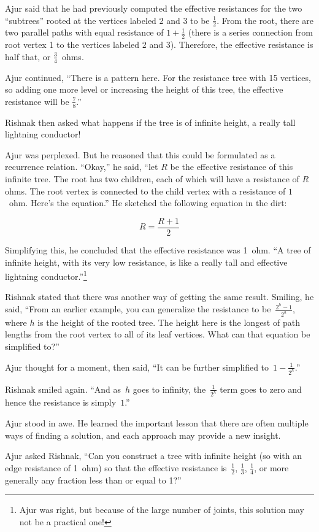 Ajur said that he had previously computed the effective resistances for the two ``subtrees'' rooted at the vertices labeled 2 and 3 to be $\frac{1}{2}$. From the root, there are two parallel paths with equal resistance of $1+\frac{1}{2}$ (there is a series connection from root vertex 1 to the vertices labeled 2 and 3). Therefore, the effective resistance is half that, or $\frac{3}{4}$~ohms.

Ajur continued, ``There is a pattern here. For the resistance tree with 15 vertices, so adding one more level or increasing the height of this tree, the effective resistance will be $\frac{7}{8}$.''

Rishnak then asked what happens if the tree is of infinite height, a really tall lightning conductor!

Ajur was perplexed. But he reasoned that this could be formulated as a recurrence relation. ``Okay,'' he said, ``let $R$ be the effective resistance of this infinite tree. The root has two children, each of which will have a resistance of $R$ ohms. The root vertex is connected to the child vertex with a resistance of $1$~ohm. Here's the equation.'' He sketched the following equation in the dirt:

$$R= \frac{R+1}{2}$$


\noindent Simplifying this, he concluded that the effective resistance was 1~ohm. ``A tree of infinite height, with its very low resistance, is like a really tall and effective lightning conductor.''\footnote{Ajur was right, but because of the large number of joints, this solution may not be a practical one!}

\newpage
Rishnak stated that there was another way of getting the same result. Smiling, he said, ``From an earlier example, you can generalize the resistance to be~$\frac{2^h-1}{2^h}$, where $h$ is the height of the rooted tree. The height here is the longest of path lengths from the root vertex to all of its leaf vertices. What can that equation be simplified to?''

Ajur thought for a moment, then said, ``It can be further simplified to~$1-\frac{1}{2^h}$.''

Rishnak smiled again. ``And as~$h$ goes to infinity, the~$\frac{1}{2^h}$ term goes to zero and hence the resistance is simply~$1$.''

Ajur stood in awe. He learned the important lesson that there are often multiple ways of finding a solution, and each approach may provide a new insight.

Ajur asked Rishnak, ``Can you construct a tree with infinite height (so with an edge resistance of 1~ohm) so that the effective resistance is~$\frac{1}{2}$, $\frac{1}{3}$, $\frac{1}{4}$, or more generally any fraction less than or equal to 1?''

